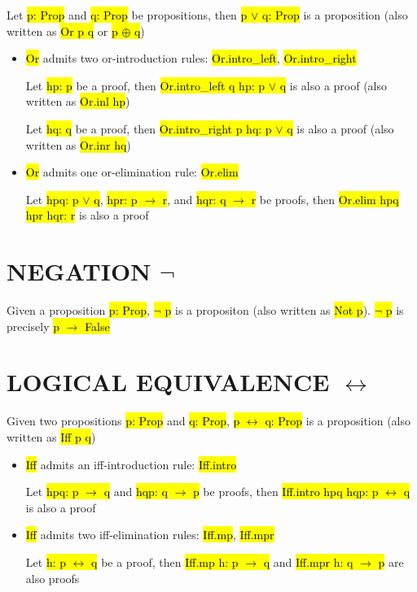 Let \hl{p: Prop} and \hl{q: Prop} be propositions, then \hl{p $\lor$ q: Prop} is a proposition (also written as \hl{Or p q} or \hl{p $\oplus$ q})

\begin{itemize}
	\item \hl{Or} admits two or-introduction rules: \hl{Or.intro\_left}, \hl{Or.intro\_right}
	
	Let \hl{hp: p} be a proof, then \hl{Or.intro\_left q hp: p $\lor$ q} is also a proof (also written as \hl{Or.inl hp})
	
	Let \hl{hq: q} be a proof, then \hl{Or.intro\_right p hq: p $\lor$ q} is also a proof (also written as \hl{Or.inr hq})
	
	\item \hl{Or} admits one or-elimination rule: \hl{Or.elim}
	
	Let \hl{hpq: p $\lor$ q}, \hl{hpr: p $\to$ r}, and \hl{hqr: q $\to$ r} be proofs, then \hl{Or.elim hpq hpr hqr: r} is also a proof
\end{itemize}


\section{NEGATION $\lnot$}

Given a proposition \hl{p: Prop}, \hl{$\lnot$ p} is a propositon (also written as \hl{Not p}). \hl{$\lnot$ p} is precisely \hl{p $\to$ False}

\section{LOGICAL EQUIVALENCE $\leftrightarrow$}

Given two propositions \hl{p: Prop} and \hl{q: Prop}, \hl{p $\leftrightarrow$ q: Prop} is a proposition (also written as \hl{Iff p q})

\begin{itemize}
	\item \hl{Iff} admits an iff-introduction rule: \hl{Iff.intro}
	
	Let \hl{hpq: p $\to$ q} and \hl{hqp: q $\to$ p} be proofs, then  \hl{Iff.intro hpq hqp: p $\leftrightarrow$ q} is also a proof
	
	\item \hl{Iff} admits two iff-elimination rules: \hl{Iff.mp}, \hl{Iff.mpr}
	
	
	Let \hl{h: p $\leftrightarrow$ q} be a proof, then \hl{Iff.mp h: p $\to$ q} and \hl{Iff.mpr h: q $\to$ p} are also proofs
\end{itemize}


